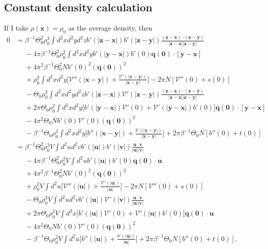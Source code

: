 \documentclass{article}
\begin{document}
\subsection{Constant density calculation}
If I take $\rho(\bm{x})=\rho_0$ as the average density, then
\begin{align}
  0
  &=\beta^{-1}\Theta_0^2\rho_0^3\int d^2xd^2yd^2z
    b'(|\bm{z}-\bm{x}|)b'(|\bm{z}-\bm{y}|)
    \frac{(\bm{z}-\bm{x})\cdot(\bm{z}-\bm{y})}{|\bm{z}-\bm{x}||\bm{z}-\bm{y}|}\nonumber\\
  &\phantom{=}-4\pi\beta^{-1}\Theta_0^2\rho_0^2\int d^2xd^2y
    b'(|\bm{y}-\bm{x}|)b'(0)\bm{q}(\bm{0})\cdot[\bm{y}-\bm{x}]\nonumber\\
  &\phantom{=}+4\pi^2\beta^{-1}\Theta_0^2Nb'(0)^2(\bm{q}(\bm{0}))^2\nonumber\\
  &\phantom{=}+\rho_0^2\int d^2xd^2y
    \bigg[\mathcal{V}''(|\bm{x}-\bm{y}|)
    +\frac{\mathcal{V}'(|\bm{x}-\bm{y}|)}{|\bm{x}-\bm{y}|}\bigg]
    -2\pi N[\mathcal{V}''(0)+s(0)]\nonumber\\
  &\phantom{=}
    -\Theta_0\rho_0^3\int d^2xd^2yd^2z
    b'(|\bm{z}-\bm{x}|)\mathcal{V}'(|\bm{z}-\bm{y}|)
    \frac{(\bm{z}-\bm{x})\cdot(\bm{z}-\bm{y})}{|\bm{z}-\bm{x}||\bm{z}-\bm{y}|}\nonumber\\
  &\phantom{=}+2\pi\Theta_0\rho_0^2\int d^2xd^2y
    \bigg[b'(|\bm{y}-\bm{x}|)\mathcal{V}'(0)+\mathcal{V}'(|\bm{y}-\bm{x}|)b'(0)\bigg]
    \bm{q}(\bm{0})\cdot[\bm{y}-\bm{x}]\nonumber\\
  &\phantom{=}-4\pi^2\Theta_0Nb'(0)\mathcal{V}'(0)(\bm{q}(\bm{0}))^2\nonumber\\
  &\phantom{=}-\beta^{-1}\Theta_0\rho_0^2\int d^2xd^2y
    \bigg[b''(|\bm{x}-\bm{y}|)
    +\frac{b'(|\bm{x}-\bm{y}|)}{|\bm{x}-\bm{y}|}\bigg]
    +2\pi\beta^{-1}\Theta_0 N[b''(0)+t(0)]\nonumber\\
  &=\beta^{-1}\Theta_0^2\rho_0^3V\int d^2ud^2v
    b'(|\bm{u}|)b'(|\bm{v}|)
    \frac{\bm{u}\cdot\bm{v}}{|\bm{u}||\bm{v}|}\nonumber\\
  &\phantom{=}-4\pi\beta^{-1}\Theta_0^2\rho_0^2V\int d^2u
    b'(|\bm{u}|)b'(0)\bm{q}(\bm{0})\cdot\bm{u}\nonumber\\
  &\phantom{=}+4\pi^2\beta^{-1}\Theta_0^2Nb'(0)^2(\bm{q}(\bm{0}))^2\nonumber\\
  &\phantom{=}+\rho_0^2V\int d^2u
    \bigg[\mathcal{V}''(|\bm{u}|)
    +\frac{\mathcal{V}'(|\bm{u}|)}{|\bm{u}|}\bigg]
    -2\pi N[\mathcal{V}''(0)+s(0)]\nonumber\\
  &\phantom{=}
    -\Theta_0\rho_0^3V\int d^2ud^2v
    b'(|\bm{u}|)\mathcal{V}'(|\bm{v}|)
    \frac{\bm{u}\cdot\bm{v}}{|\bm{u}||\bm{v}|}\nonumber\\
  &\phantom{=}+2\pi\Theta_0\rho_0^2V\int d^2x
    \bigg[b'(|\bm{u}|)\mathcal{V}'(0)+\mathcal{V}'(|\bm{u}|)b'(0)\bigg]
    \bm{q}(\bm{0})\cdot\bm{u}\nonumber\\
  &\phantom{=}-4\pi^2\Theta_0Nb'(0)\mathcal{V}'(0)(\bm{q}(\bm{0}))^2\nonumber\\
  &\phantom{=}-\beta^{-1}\Theta_0\rho_0^2V\int d^2u
    \bigg[b''(|\bm{u}|)
    +\frac{b'(|\bm{u}|)}{|\bm{u}|}\bigg]
    +2\pi\beta^{-1}\Theta_0 N[b''(0)+t(0)].
\end{align}
\end{document}
